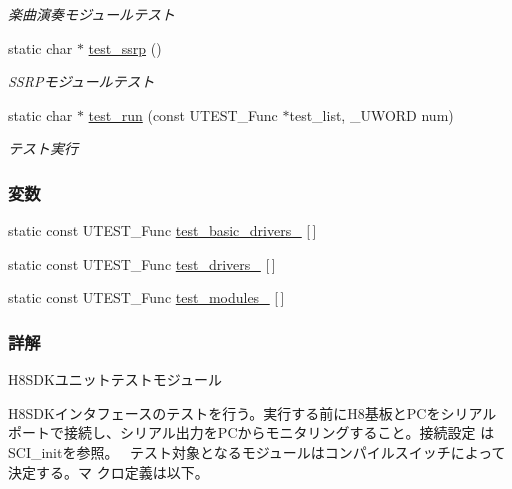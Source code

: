 \begin{DoxyCompactItemize}
\begin{DoxyCompactList}\small\item\em 楽曲演奏モジュールテスト \end{DoxyCompactList}\item 
static char $\ast$ \hyperlink{test_8h_a81969d7889d0add7566986d3ada39730_a81969d7889d0add7566986d3ada39730}{test\+\_\+ssrp} ()
\begin{DoxyCompactList}\small\item\em S\+S\+R\+Pモジュールテスト \end{DoxyCompactList}\item 
static char $\ast$ \hyperlink{test_8h_a9ae0c310318e7e033f6501180bf2db63_a9ae0c310318e7e033f6501180bf2db63}{test\+\_\+run} (const U\+T\+E\+S\+T\+\_\+\+Func $\ast$test\+\_\+list, \+\_\+\+U\+W\+O\+R\+D num)
\begin{DoxyCompactList}\small\item\em テスト実行 \end{DoxyCompactList}\end{DoxyCompactItemize}
\subsubsection*{変数}
\begin{DoxyCompactItemize}
\item 
static const U\+T\+E\+S\+T\+\_\+\+Func \hyperlink{test_8h_aecea56d22e41e21655d6b3ec2a285773_aecea56d22e41e21655d6b3ec2a285773}{test\+\_\+basic\+\_\+drivers\+\_\+} \mbox{[}$\,$\mbox{]}
\item 
static const U\+T\+E\+S\+T\+\_\+\+Func \hyperlink{test_8h_abe2ed58a39ac6eb45ded0391dbcc40e7_abe2ed58a39ac6eb45ded0391dbcc40e7}{test\+\_\+drivers\+\_\+} \mbox{[}$\,$\mbox{]}
\item 
static const U\+T\+E\+S\+T\+\_\+\+Func \hyperlink{test_8h_af4c691f85a9ae8b544bc41f208273702_af4c691f85a9ae8b544bc41f208273702}{test\+\_\+modules\+\_\+} \mbox{[}$\,$\mbox{]}
\end{DoxyCompactItemize}


\subsubsection{詳解}
H8\+S\+D\+Kユニットテストモジュール 

H8\+S\+D\+Kインタフェースのテストを行う。実行する前に\+H8基板と\+P\+Cをシリアル ポートで接続し、シリアル出力を\+P\+Cからモニタリングすること。接続設定 は\+S\+C\+I\+\_\+initを参照。~\newline
テスト対象となるモジュールはコンパイルスイッチによって決定する。マ クロ定義は以下。

